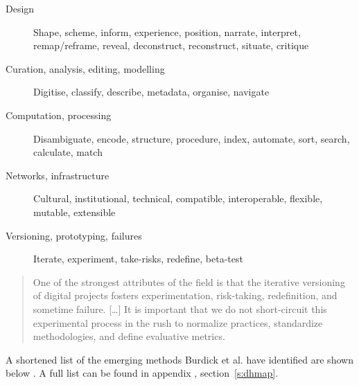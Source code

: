 \begin{description}
  \item [Design] Shape, scheme, inform, experience, position, narrate,
  					interpret, remap/reframe, reveal, deconstruct, reconstruct,
  					situate, critique
  \item [Curation, analysis, editing, modelling] Digitise, classify, describe, metadata, organise, navigate
  \item [Computation, processing] Disambiguate, encode, structure, procedure, index, automate, sort, search, calculate, match
  \item [Networks, infrastructure] Cultural, institutional, technical, compatible, interoperable, flexible, mutable, extensible
  \item [Versioning, prototyping, failures]	Iterate, experiment, take-risks, redefine, beta-test
\end{description}


\begin{quotation}
  One of the strongest attributes of the field is that the iterative versioning of digital projects fosters experimentation, risk-taking, redefinition, and sometime failure. [\ldots] It is important that we do not short-circuit this experimental process in the rush to normalize practices, standardize methodologies, and define evaluative metrics.
\end{quotation}

A shortened list of the emerging methods Burdick et al. have identified are shown below \citeyear[p.29-60]{Burdick2012}. A full list can be found in appendix , section~\ref{s:dhmap}.


